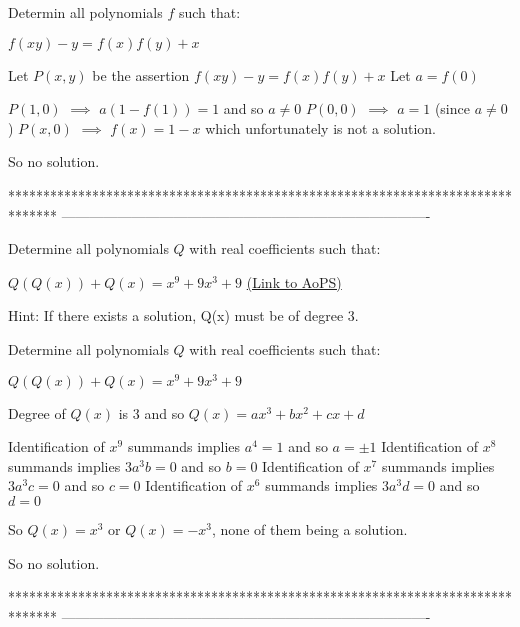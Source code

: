 \begin{solution}
	\begin{tcolorbox}Determin all polynomials $f$ such that:

$f(xy)-y=f(x)f(y)+x$
\end{tcolorbox}
Let $P(x,y)$ be the assertion $f(xy)-y=f(x)f(y)+x$
Let $a=f(0)$

$P(1,0)$ $\implies$ $a(1-f(1))=1$ and so $a\ne 0$
$P(0,0)$ $\implies$ $a=1$ (since $a\ne 0$)
$P(x,0)$ $\implies$ $f(x)=1-x$ which unfortunately is not a solution.

So no solution.
\end{solution}
*******************************************************************************
-------------------------------------------------------------------------------

\begin{problem}
	Determine all polynomials $Q$ with real coefficients such that:

$Q(Q(x))+Q(x)=x^9+9x^3+9$
	\flushright \href{https://artofproblemsolving.com/community/c6h608835}{(Link to AoPS)}
\end{problem}



\begin{solution}
	Hint:
If there exists a solution, Q(x) must be of degree 3.
\end{solution}



\begin{solution}
	\begin{tcolorbox}Determine all polynomials $Q$ with real coefficients such that:

$Q(Q(x))+Q(x)=x^9+9x^3+9$\end{tcolorbox}

Degree of $Q(x)$ is $3$ and so $Q(x)=ax^3+bx^2+cx+d$

Identification of $x^9$ summands implies $a^4=1$ and so $a=\pm 1$
Identification of $x^8$ summands implies $3a^3b=0$ and so $b=0$
Identification of $x^7$ summands implies $3a^3c=0$ and so $c=0$
Identification of $x^6$ summands implies $3a^3d=0$ and so $d=0$

So $Q(x)=x^3$ or $Q(x)=-x^3$, none of them being a solution.

So no solution.
\end{solution}
*******************************************************************************
-------------------------------------------------------------------------------

